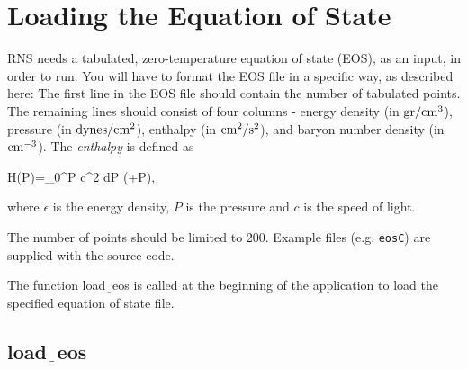 \section{Loading the Equation of State}

RNS needs a tabulated, zero-temperature equation of state (EOS), as an input, 
in order to run. 
You will have to format the EOS file in a specific way, as described here: 
The first line in the EOS file should contain the number of tabulated points. 
The remaining lines should consist of four columns - energy 
density (in ${\rm gr/cm^3}$), pressure (in ${\rm dynes/cm^2}$), enthalpy (in
${\rm cm^2/s^2}$), and baryon number density (in ${\rm cm^{-3}}$). The 
{\it enthalpy} is defined as

\be H(P)=\int_0^P { c^2 dP \over (\epsilon +P)}, \ee

\<where $\epsilon$ is the energy density, $P$ is the pressure and $c$ is the
speed of light.

The number of points should be limited to 200. Example files 
(e.g. {\tt eosC}) are supplied with the source code.

The function load$\underline{\;\;}$eos is called at the beginning
of the application to load the specified equation of state file. 


\subsection{load$\underline{\;\;}$eos}

